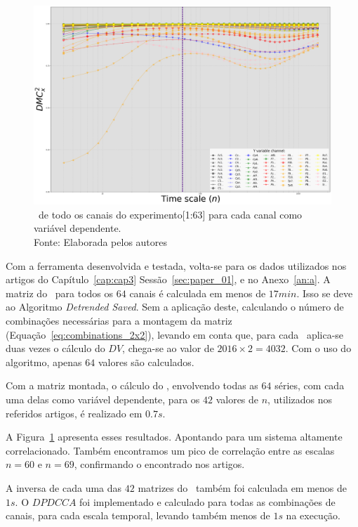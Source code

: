 \begin{figure}[!htb]
	\centering
	\includegraphics[width=.95\textwidth]{./Figures/art_03/dmc_all.png}
  \captionsetup{justification=centering}
  \caption{\dmc~de todo os canais do experimento[1:63] para cada canal como variável dependente.\\Fonte: Elaborada pelos autores}

	\label{fig:a03_dmc_total}
\end{figure}

Com a ferramenta desenvolvida e testada, volta-se para os dados utilizados nos artigos do Capítulo~\ref{cap:cap3} Sessão~\ref{sec:paper_01}, e no Anexo~\ref{an:a}. A matriz do \pdcca~para todos os $64$ canais é calculada em menos de $17min$. Isso se deve ao Algoritmo \emph{Detrended Saved}. Sem a aplicação deste, calculando o número de combinações necessárias para a montagem da matriz (Equação~\ref{eq:combinations_2x2}), levando em conta que, para cada \dcca~aplica-se duas vezes o cálculo do $DV$, chega-se ao valor de $2016 \times 2 = 4032$. Com o uso do algoritmo, apenas $64$ valores são calculados.

Com a matriz montada, o cálculo do \dmc, envolvendo todas as $64$ séries, com cada uma delas como variável dependente, para os $42$ valores de $n$, utilizados nos referidos artigos, é realizado em $0.7s$.

A Figura~\ref{fig:a03_dmc_total} apresenta esses resultados. Apontando para um sistema altamente correlacionado. Também encontramos um pico de correlação entre as escalas $n=60$ e $n=69$, confirmando o encontrado nos artigos.

A inversa de cada uma das $42$ matrizes do \pdcca~também foi calculada em menos de $1s$. O $DPDCCA$ foi implementado e calculado para todas as combinações de canais, para cada escala temporal, levando também menos de $1s$ na execução.

